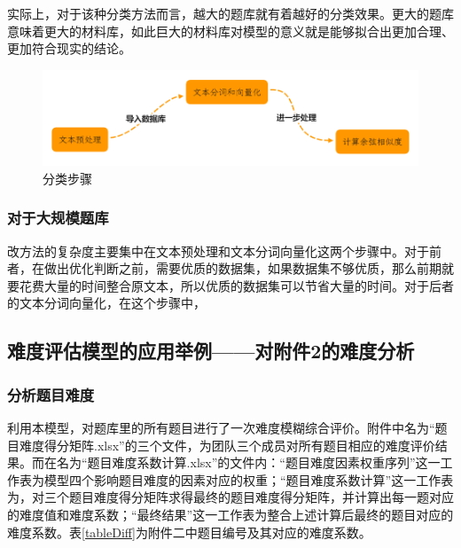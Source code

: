 实际上，对于该种分类方法而言，越大的题库就有着越好的分类效果。更大的题库意味着更大的材料库，如此巨大的材料库对模型的意义就是能够拟合出更加合理、更加符合现实的结论。

\begin{figure}[h]
    \centering
    \includegraphics[scale=0.3]{res/figure041640.png}
    \caption{分类步骤}
\end{figure}

\subsubsection{对于大规模题库}

改方法的复杂度主要集中在文本预处理和文本分词向量化这两个步骤中。对于前者，在做出优化判断之前，需要优质的数据集，如果数据集不够优质，那么前期就要花费大量的时间整合原文本，所以优质的数据集可以节省大量的时间。对于后者的文本分词向量化，在这个步骤中，

\subsection{难度评估模型的应用举例——对附件2的难度分析}

\subsubsection{分析题目难度}

利用本模型，对题库里的所有题目进行了一次难度模糊综合评价。附件中名为“题目难度得分矩阵.xlsx”的三个文件，为团队三个成员对所有题目相应的难度评价结果。而在名为“题目难度系数计算.xlsx”的文件内：“题目难度因素权重序列”这一工作表为模型四个影响题目难度的因素对应的权重；“题目难度系数计算”这一工作表为，对三个题目难度得分矩阵求得最终的题目难度得分矩阵，并计算出每一题对应的难度值和难度系数；“最终结果”这一工作表为整合上述计算后最终的题目对应的难度系数。表\ref{tableDiff}为附件二中题目编号及其对应的难度系数。

